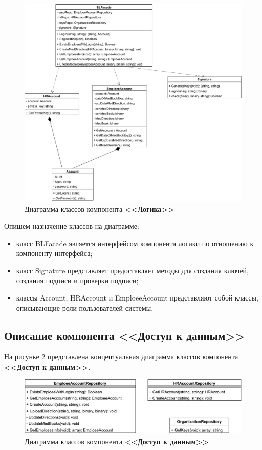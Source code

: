 \documentclass[12pt]{report}
\begin{document}
\begin{figure}[h!]
	\centering
	\includegraphics[width = \linewidth]{BL.pdf}
	\caption{Диаграмма классов компонента \textbf{<<Логика>>}}
	\label{fig:uml_bl}
\end{figure}

Опишем назначение классов на диаграмме:

\begin{itemize}  \renewcommand\labelitemi{---} 
    \item класс BLFacade является интерфейсом компонента логики по отношению к компоненту интерфейса;
    \item класс Signature представляет предоставляет методы для создания ключей, создания подписи и проверки подписи;
    \item классы Account, HRAccount и EmploeeAccount представляют собой классы, описывающие роли пользователей системы. 
\end{itemize}

\subsection{Описание компонента <<Доступ к данным>>}

На рисунке \ref{fig:uml_da} представлена концептуальная диаграмма классов компонента \textbf{<<Доступ к данным>>}.

\begin{figure}[h!]
	\centering
	\includegraphics[scale=0.8]{DA.pdf}
	\caption{Диаграмма классов компонента \textbf{<<Доступ к данным>>}}
	\label{fig:uml_da}
\end{figure}
\end{document}
